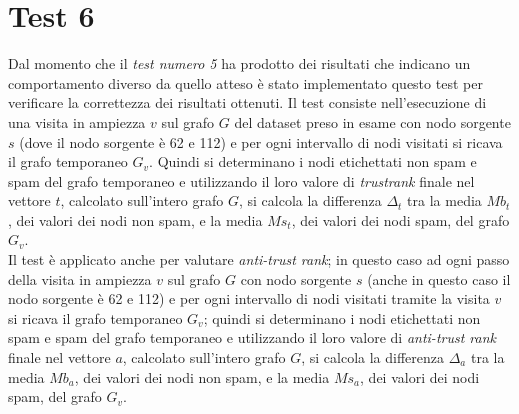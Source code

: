 \section{Test 6}
Dal momento che il \textit{test numero 5} ha prodotto dei risultati che indicano un comportamento diverso da quello atteso è stato implementato questo test per verificare la correttezza dei risultati ottenuti. Il test consiste nell'esecuzione di una visita in ampiezza \(v\) sul grafo \(G\) del dataset preso in esame con nodo sorgente \(s\) (dove il nodo sorgente è 62 e  112) e per ogni intervallo di nodi visitati si ricava il grafo temporaneo \(G_v\). Quindi si determinano i nodi etichettati non spam e spam del grafo temporaneo e utilizzando il loro valore di \textit{trustrank} finale nel vettore \(t\), calcolato sull'intero grafo \(G\), si calcola la differenza \(\Delta_t\)   tra la media \(Mb_t\), dei valori dei nodi non spam, e la media \(Ms_t\), dei valori dei nodi spam,  del grafo \(G_v\).\\
Il test è applicato anche per valutare \textit{anti-trust rank}; in questo caso ad ogni passo della visita in ampiezza \(v\) sul grafo \(G\) con nodo sorgente \(s\) (anche in questo caso il nodo sorgente è 62 e  112) e per ogni intervallo di nodi visitati tramite la visita \(v\) si ricava il grafo temporaneo \(G_v\); quindi si determinano i nodi etichettati non spam e spam del grafo temporaneo e utilizzando il loro valore di \textit{anti-trust rank} finale nel vettore \(a\), calcolato sull'intero grafo \(G\), si calcola la differenza \(\Delta_a\)   tra la media \(Mb_a\), dei valori dei nodi non spam, e la media \(Ms_a\), dei valori dei nodi spam,  del grafo \(G_v\).
